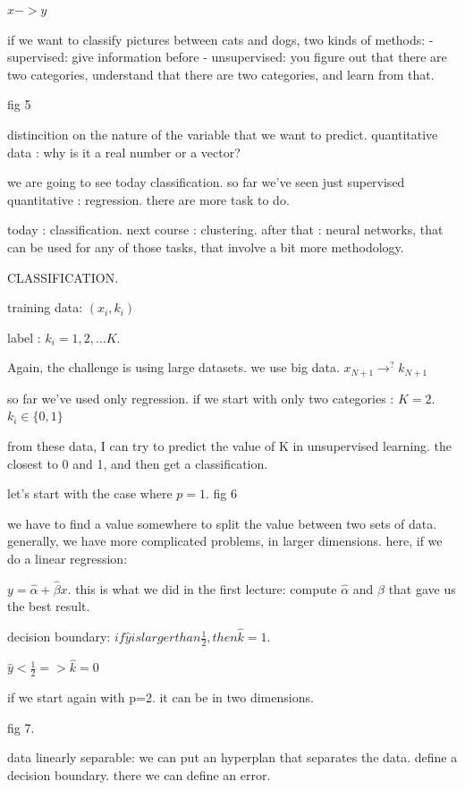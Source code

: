 \documentclass[a4paper]{tufte-book}
\newcommand{\half}{\frac{1}{2}}
\begin{document}
$x->y$

if we want to classify pictures between cats and dogs, two kinds of methods:
- supervised: give information before
- unsupervised: you figure out that there are two categories, understand that
there are two categories, and learn from that.

fig 5

distincition on the nature of the variable that we want to predict.
quantitative data : why is it a real number or a vector?

we are going to see today classification. so far we've seen just supervised
quantitative : regression. there are more task to do.

today : classification.
next course : clustering.
after that : neural networks, that can be used for any of those tasks, that
involve a bit more methodology.

CLASSIFICATION. 

training data: $(x_i,k_i)$

label : $k_i = 1, 2, \ldots K$.



Again, the challenge is using large datasets. we use big data.
$x_{N+1} \rightarrow^? k_{N+1}$

so far we've used only regression.
if we start with only two categories : $K=2$.
$k_i \in \{ 0, 1 \}$

from these data, I can try to predict the value of K in unsupervised learning.
the closest to 0 and 1, and then get a classification.

let's start with the case where $p=1$.
fig 6

we have to find a value somewhere to split the value between two sets of data.
generally, we have more complicated problems, in larger dimensions.
here, if we do a linear regression:

$y = \hat \alpha + \hat \beta x$.
this is what we did in the first lecture: compute $\hat \alpha$ and $\hat \beta$ that gave us
the best result.

decision boundary:
$if \hat y is larger than \half, then \hat k = 1$.

$\hat y < \half => \hat k = 0$

if we start again with p=2.
it can be in two dimensions.

fig 7.

data linearly separable: we can put an hyperplan that separates the data.
define a decision boundary.
there we can define an error.
\end{document}
